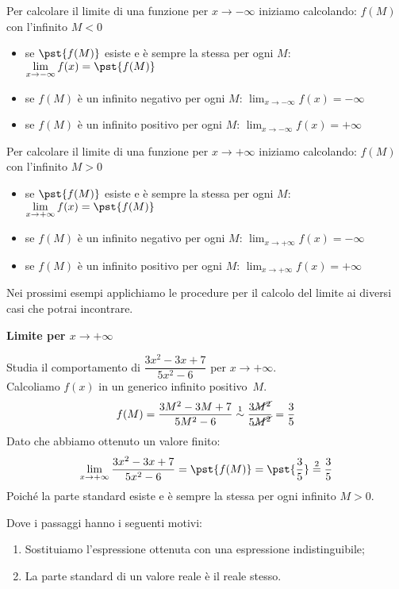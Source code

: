 \begin{procedura}
Per calcolare il limite di una funzione per 
\(x \to -\infty\)
iniziamo calcolando:
\(f(M)\) con l'infinito \(M < 0\)
\begin{itemize}
\item 
se \(\pst{f(M)}\) esiste e è sempre la stessa per ogni \(M\): \quad 
\(\displaystyle \lim_{x \to -\infty}f(x) = \pst{f(M)}\)
\item 
se \(f(M)\) è un infinito negativo per ogni \(M\): 
\quad \(\displaystyle \lim_{x \to -\infty}f(x) = -\infty\)
\item 
se \(f(M)\) è un infinito positivo per ogni \(M\): 
\quad \(\displaystyle \lim_{x \to -\infty}f(x) = +\infty\)
\end{itemize}
\end{procedura}

\begin{procedura}
Per calcolare il limite di una funzione per 
\(x \to +\infty\)
iniziamo calcolando:
\(f(M)\) con l'infinito \(M > 0\)
\begin{itemize}
\item 
se \(\pst{f(M)}\) esiste e è sempre la stessa per ogni \(M\): \quad 
\(\displaystyle \lim_{x \to +\infty}f(x) = \pst{f(M)}\)
\item 
se \(f(M)\) è un infinito negativo per ogni \(M\): 
\quad \(\displaystyle \lim_{x \to +\infty}f(x) = -\infty\)
\item 
se \(f(M)\) è un infinito positivo per ogni \(M\): 
\quad \(\displaystyle \lim_{x \to +\infty}f(x) = +\infty\)
\end{itemize}
\end{procedura}

Nei prossimi esempi applichiamo le procedure per il calcolo del limite 
ai diversi casi che potrai incontrare.

\begin{esempio}
\textbf{Limite per \(x \to + \infty\)}

Studia il comportamento di 
\(\dfrac{3x^2-3x+7}{5x^2-6}\) per \(x \to +\infty\).\\
Calcoliamo \(f(x)\) in un generico infinito positivo~\(M\).
\[
f(M)= 
  \frac{3M^2-3M+7}{5M^2-6} \stackrel{1}{\sim} 
  \frac{3\cancel{M^2}}{5\cancel{M^2}} = \frac{3}{5}
\]
Dato che abbiamo ottenuto un valore finito:
\[\lim_{x \to +\infty}\frac{3x^2-3x+7}{5x^2-6} = 
  \pst{f(M)} = \pst{\frac{3}{5}} \stackrel{2}{=} \frac{3}{5}\]
Poiché la parte standard esiste e è sempre la stessa per ogni 
infinito \(M > 0\). 

Dove i passaggi hanno i seguenti motivi:
\begin{enumerate} [nosep]
\item Sostituiamo l'espressione ottenuta con una espressione 
  indistinguibile;
\item La parte standard di un valore reale è il reale stesso.
\end{enumerate}
\end{esempio}


